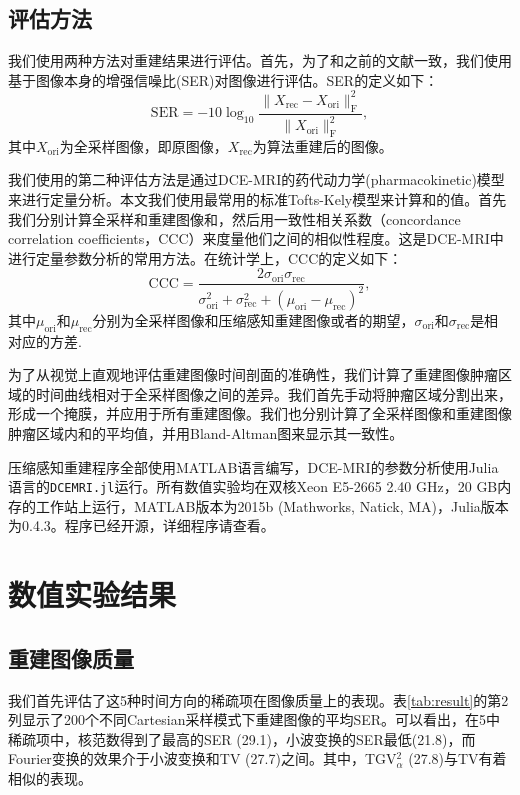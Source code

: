 \subsection{评估方法}
我们使用两种方法对重建结果进行评估。首先，为了和之前的文献一致，我们使用基于图像本身的增强信噪比(SER)对图像进行评估。SER的定义如下：
\begin{equation}
\mathrm{SER} = -10 \log_{10}\frac{\|X_\mathrm{rec}-X_\mathrm{ori}\|_\mathrm{F}^2}{\|X_\mathrm{ori}\|_\mathrm{F}^2},
\end{equation}
其中$X_{\mathrm{ori}}$为全采样图像，即原图像，$X_{\mathrm{rec}}$为算法重建后的图像。

我们使用的第二种评估方法是通过DCE-MRI的药代动力学(pharmacokinetic)模型来进行定量分析。本文我们使用最常用的标准Tofts-Kely模型\cite{tofts}来计算\kt 和\Ve 的值。首先我们分别计算全采样和重建图像\kt 和\Ve，然后用一致性相关系数（concordance correlation coefficients，CCC）来度量他们之间的相似性程度。这是DCE-MRI中进行定量参数分析的常用方法。在统计学上，CCC的定义如下：
\begin{equation}
\mathrm{CCC} = \frac{2\sigma_\mathrm{ori} \sigma_\mathrm{rec}}{\sigma_\mathrm{ori}^2+\sigma_\mathrm{rec}^2+(\mu_\mathrm{ori}-\mu_\mathrm{rec})^2},
\end{equation}
其中$\mu_\mathrm{ori}$和$\mu_\mathrm{rec}$分别为全采样图像和压缩感知重建图像\kt 或者\Ve 的期望，$\sigma_\mathrm{ori}$和$\sigma_\mathrm{rec}$是相对应的方差.

为了从视觉上直观地评估重建图像时间剖面的准确性，我们计算了重建图像肿瘤区域的时间曲线相对于全采样图像之间的差异。我们首先手动将肿瘤区域分割出来，形成一个掩膜，并应用于所有重建图像。我们也分别计算了全采样图像和重建图像肿瘤区域内\kt 和\Ve 的平均值，并用Bland-Altman图来显示其一致性。

压缩感知重建程序全部使用MATLAB语言编写，DCE-MRI的参数分析使用Julia语言的\texttt{DCEMRI.jl}\cite{Smith2015}运行。所有数值实验均在双核Xeon E5-2665 2.40 GHz，20 GB内存的工作站上运行，MATLAB版本为2015b (Mathworks, Natick, MA)，Julia版本为0.4.3。程序已经开源，详细程序请查看\cite{qetsr}。

\section{数值实验结果}
\subsection{重建图像质量}
我们首先评估了这5种时间方向的稀疏项在图像质量上的表现。表\ref{tab:result}的第2列显示了200个不同Cartesian采样模式下重建图像的平均SER。可以看出，在5中稀疏项中，核范数得到了最高的SER (29.1)，小波变换的SER最低(21.8)，而Fourier变换的效果介于小波变换和TV (27.7)之间。其中，TGV$_\alpha^2$ (27.8)与TV有着相似的表现。

